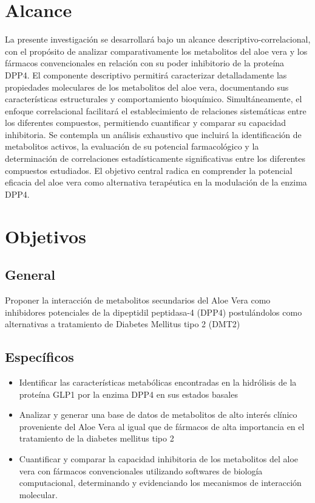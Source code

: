 \section{Alcance}
La presente investigación se desarrollará bajo un alcance descriptivo-correlacional, con el propósito de analizar comparativamente los metabolitos del aloe vera y los fármacos convencionales en relación con su poder inhibitorio de la proteína DPP4.
El componente descriptivo permitirá caracterizar detalladamente las propiedades moleculares de los metabolitos del aloe vera, documentando sus características estructurales y comportamiento bioquímico. Simultáneamente, el enfoque correlacional facilitará el establecimiento de relaciones sistemáticas entre los diferentes compuestos, permitiendo cuantificar y comparar su capacidad inhibitoria.
Se contempla un análisis exhaustivo que incluirá la identificación de metabolitos activos, la evaluación de su potencial farmacológico y la determinación de correlaciones estadísticamente significativas entre los diferentes compuestos estudiados. El objetivo central radica en comprender la potencial eficacia del aloe vera como alternativa terapéutica en la modulación de la enzima DPP4.

\section{Objetivos}

\subsection{General}
Proponer la interacción de metabolitos secundarios del Aloe Vera como inhibidores potenciales de la dipeptidil peptidasa-4 (DPP4) postulándolos como alternativas a tratamiento de Diabetes Mellitus tipo 2 (DMT2)

\subsection{Específicos}

\begin{itemize}
 \item Identificar las características metabólicas encontradas en la hidrólisis de la proteína GLP1 por la enzima DPP4 en sus estados basales
 \item Analizar y generar una base de datos de metabolitos de alto interés clínico proveniente del Aloe Vera al igual que de fármacos de alta importancia en el tratamiento de la diabetes mellitus tipo 2 
 \item Cuantificar y comparar la capacidad inhibitoria de los metabolitos del aloe vera con fármacos convencionales utilizando softwares de biología computacional, determinando y evidenciando los mecanismos de interacción molecular.

\end{itemize}

